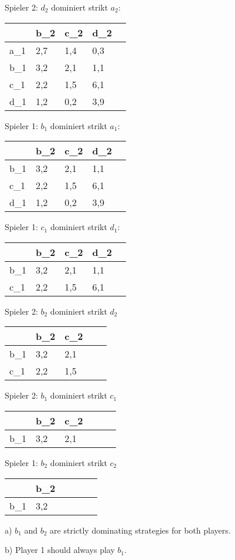 \documentclass[a4paper,
  twoside, %
  headlines=2.1 %
  ]{scrartcl}
\begin{document}
Spieler 2: $d_2$ dominiert strikt $a_2$:

\begin{table}[H]
\begin{tabular}{|l|l|l|l|l|}
\hline
 & b_2 & c_2 & d_2 \\ \hline
a_1 & 2,7 & 1,4 & 0,3\\ \hline
b_1 & 3,2 & 2,1 & 1,1\\ \hline
c_1 & 2,2 & 1,5 & 6,1 \\ \hline
d_1 & 1,2 & 0,2 & 3,9 \\ \hline
\end{tabular}
\end{table}

Spieler 1: $b_1$ dominiert strikt $a_1$:

\begin{table}[H]
\begin{tabular}{|l|l|l|l|l|}
\hline
 & b_2 & c_2 & d_2 \\ \hline
b_1 & 3,2 & 2,1 & 1,1\\ \hline
c_1 & 2,2 & 1,5 & 6,1 \\ \hline
d_1 & 1,2 & 0,2 & 3,9 \\ \hline
\end{tabular}
\end{table}

Spieler 1: $c_1$ dominiert strikt $d_1$:

\begin{table}[H]
\begin{tabular}{|l|l|l|l|l|}
\hline
 & b_2 & c_2 & d_2\\ \hline
b_1 & 3,2 & 2,1 & 1,1\\ \hline
c_1 & 2,2 & 1,5 & 6,1\\ \hline
\end{tabular}
\end{table}

Spieler 2: $b_2$ dominiert strikt $d_2$

\begin{table}[H]
\begin{tabular}{|l|l|l|l|l|}
\hline
 & b_2 & c_2\\ \hline
b_1 & 3,2 & 2,1\\ \hline
c_1 & 2,2 & 1,5\\ \hline
\end{tabular}
\end{table}

Spieler 2: $b_1$ dominiert strikt $c_1$
\begin{table}[H]
\begin{tabular}{|l|l|l|l|l|l|}
\hline
 & b_2 & c_2\\ \hline
b_1 & 3,2 & 2,1\\ \hline
\end{tabular}
\end{table}

Spieler 1: $b_2$ dominiert strikt $c_2$
\begin{table}[H]
\begin{tabular}{|l|l|l|l|l|l|}
\hline
 & b_2\\ \hline
b_1 & 3,2\\ \hline
\end{tabular}
\end{table}

a) $b_1$ and $b_2$ are strictly dominating strategies for both players.

b) Player 1 should always play $b_1$.
\end{document}
